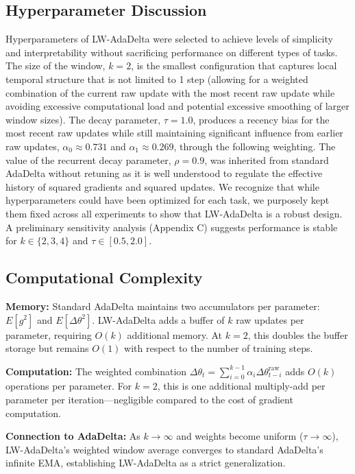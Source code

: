 \documentclass[11pt,a4paper]{article}
\begin{document}
\subsection{Hyperparameter Discussion}

Hyperparameters of LW-AdaDelta were selected to achieve levels of simplicity and interpretability without sacrificing performance on different types of tasks. The size of the window, $k=2$, is the smallest configuration that captures local temporal structure that is not limited to 1 step (allowing for a weighted combination of the current raw update with the most recent raw update while avoiding excessive computational load and potential excessive smoothing of larger window sizes). The decay parameter, $\tau=1.0$, produces a recency bias for the most recent raw updates while still maintaining significant influence from earlier raw updates, $\alpha_0 \approx 0.731$ and $\alpha_1 \approx 0.269$, through the following weighting. The value of the recurrent decay parameter, $\rho=0.9$, was inherited from standard AdaDelta without retuning as it is well understood to regulate the effective history of squared gradients and squared updates. We recognize that while hyperparameters could have been optimized for each task, we purposely kept them fixed across all experiments to show that LW-AdaDelta is a robust design. A preliminary sensitivity analysis (Appendix C) suggests performance is stable for $k \in \{2,3,4\}$ and $\tau \in [0.5,2.0]$.

\subsection{Computational Complexity}

\textbf{Memory:} Standard AdaDelta maintains two accumulators per parameter: $E[g^2]$ and $E[\Delta\theta^2]$. LW-AdaDelta adds a buffer of $k$ raw updates per parameter, requiring $O(k)$ additional memory. At $k = 2$, this doubles the buffer storage but remains $O(1)$ with respect to the number of training steps.

\textbf{Computation:} The weighted combination $\Delta\theta_t = \sum_{i=0}^{k-1} \alpha_i \Delta\theta_{t-i}^{\text{raw}}$ adds $O(k)$ operations per parameter. For $k = 2$, this is one additional multiply-add per parameter per iteration---negligible compared to the cost of gradient computation.

\textbf{Connection to AdaDelta:} As $k \rightarrow \infty$ and weights become uniform ($\tau \rightarrow \infty$), LW-AdaDelta's weighted window average converges to standard AdaDelta's infinite EMA, establishing LW-AdaDelta as a strict generalization.
\end{document}
